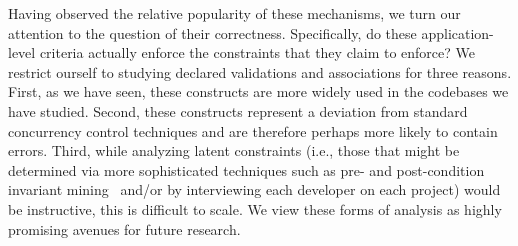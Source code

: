 Having observed the relative popularity of these mechanisms, we turn
our attention to the question of their correctness. Specifically, do
these application-level criteria actually enforce the constraints that
they claim to enforce? We restrict ourself to studying declared
validations and associations for three reasons. First, as we have
seen, these constructs are more widely used in the codebases we have
studied. Second, these constructs represent a deviation from standard
concurrency control techniques and are therefore perhaps more likely
to contain errors. Third, while analyzing latent constraints (i.e.,
those that might be determined via more sophisticated techniques such
as pre- and post-condition invariant
mining~\cite{writes-forest,redblue-new} and/or by interviewing each
developer on each project) would be instructive, this is difficult to
scale. We view these forms of analysis as highly promising avenues for
future research.
